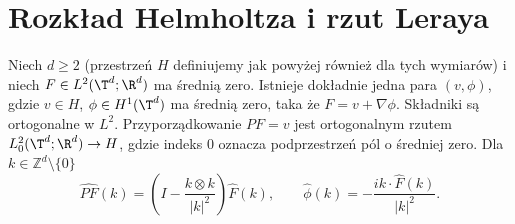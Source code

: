 \section{Rozkład Helmholtza i rzut Leraya}
\begin{twierdzenie}\label{thm:pde28-helmholtz}
Niech $d\ge2$ (przestrzeń $H$ definiujemy jak powyżej
również dla tych wymiarów) i niech
$F\in L^2(\T^d;\R^d)$ ma średnią zero.
Istnieje dokładnie jedna para $(v,\phi)$, gdzie
$v\in H$, $\phi\in H^1(\T^d)$ ma średnią zero, taka że
$F=v+\nabla\phi$. Składniki są ortogonalne w $L^2$.
Przyporządkowanie $PF=v$ jest ortogonalnym rzutem
$L^2_0(\T^d;\R^d)\to H$, gdzie indeks $0$ oznacza
podprzestrzeń pól o średniej zero. Dla
$k\in\mathbb Z^d\setminus\{0\}$
\begin{equation}\label{eq:pde28-P}
 \widehat{PF}(k)=\left(I-\frac{k\otimes k}{|k|^2}\right)\widehat F(k),
 \qquad \widehat\phi(k)=-\frac{i k\cdot\widehat F(k)}{|k|^2}.
\end{equation}
\end{twierdzenie}
